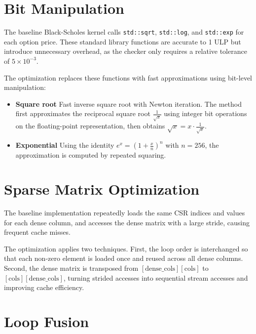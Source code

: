 \documentclass[11pt]{article}
\begin{document}
\section{Bit Manipulation}

The baseline Black-Scholes kernel calls \texttt{std::sqrt}, \texttt{std::log}, and \texttt{std::exp} for each option price. These standard library functions are accurate to 1 ULP but introduce unnecessary overhead, as the checker only requires a relative tolerance of $5\times10^{-3}$.

\vspace{0.3em}

\noindent The optimization replaces these functions with fast approximations using bit-level manipulation:
\begin{itemize}
    \item \textbf{Square root} Fast inverse square root with Newton iteration. The method first approximates the reciprocal square root $\frac{1}{\sqrt{x}}$ using integer bit operations on the floating-point representation, then obtains $\sqrt{x} = x \cdot \frac{1}{\sqrt{x}}$.
    \item \textbf{Exponential} Using the identity $e^x = (1 + \frac{x}{n})^{n}$ with $n=256$, the approximation is computed by repeated squaring.
\end{itemize}

\section{Sparse Matrix Optimization}

The baseline implementation repeatedly loads the same CSR indices and
values for each dense column, and accesses the dense matrix with a large
stride, causing frequent cache misses.

\vspace{0.3em}

\noindent The optimization applies two techniques. First, the loop order is
interchanged so that each non-zero element is loaded once and reused
across all dense columns. Second, the dense matrix is transposed from
$[\text{dense\_cols}][\text{cols}]$ to $[\text{cols}][\text{dense\_cols}]$,
turning strided accesses into sequential stream accesses and improving
cache efficiency.

\section{Loop Fusion}
\end{document}
